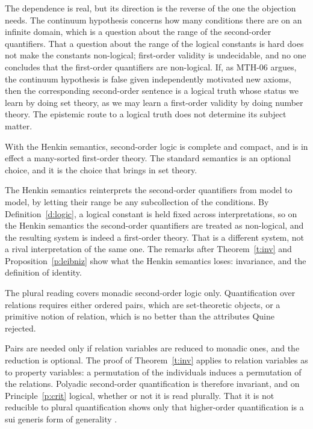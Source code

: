 \documentclass{situationist-preprint}
\begin{document}
\begin{reply}
The dependence is real, but its direction is the reverse of the one the objection needs. The continuum hypothesis concerns how many conditions there are on an infinite domain, which is a question about the range of the second-order quantifiers. That a question about the range of the logical constants is hard does not make the constants non-logical; first-order validity is undecidable, and no one concludes that the first-order quantifiers are non-logical. If, as MTH-06 argues, the continuum hypothesis is false given independently motivated new axioms, then the corresponding second-order sentence is a logical truth whose status we learn by doing set theory, as we may learn a first-order validity by doing number theory. The epistemic route to a logical truth does not determine its subject matter.
\end{reply}

\begin{objection}
With the Henkin semantics, second-order logic is complete and compact, and is in effect a many-sorted first-order theory. The standard semantics is an optional choice, and it is the choice that brings in set theory.
\end{objection}

\begin{reply}
The Henkin semantics reinterprets the second-order quantifiers from model to model, by letting their range be any subcollection of the conditions. By Definition~\ref{d:logic}, a logical constant is held fixed across interpretations, so on the Henkin semantics the second-order quantifiers are treated as non-logical, and the resulting system is indeed a first-order theory. That is a different system, not a rival interpretation of the same one. The remarks after Theorem~\ref{t:inv} and Proposition~\ref{p:leibniz} show what the Henkin semantics loses: invariance, and the definition of identity.
\end{reply}

\begin{objection}
The plural reading covers monadic second-order logic only. Quantification over relations requires either ordered pairs, which are set-theoretic objects, or a primitive notion of relation, which is no better than the attributes Quine rejected.
\end{objection}

\begin{reply}
Pairs are needed only if relation variables are reduced to monadic ones, and the reduction is optional. The proof of Theorem~\ref{t:inv} applies to relation variables as to property variables: a permutation of the individuals induces a permutation of the relations. Polyadic second-order quantification is therefore invariant, and on Principle~\ref{p:crit} logical, whether or not it is read plurally. That it is not reducible to plural quantification shows only that higher-order quantification is a sui generis form of generality \citep{Prior1971,Williamson2003}.
\end{reply}
\end{document}
